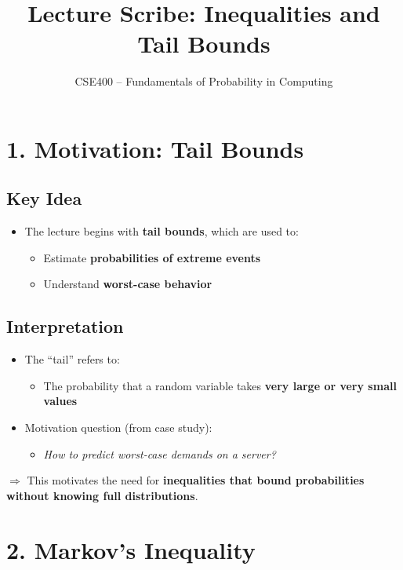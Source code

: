 \documentclass[12pt]{article}
\title{\textbf{Lecture Scribe: Inequalities and Tail Bounds}}
\author{CSE400 – Fundamentals of Probability in Computing}
\date{}
\begin{document}
\maketitle

\section*{1. Motivation: Tail Bounds}

\subsection*{Key Idea}

\begin{itemize}
    \item The lecture begins with \textbf{tail bounds}, which are used to:
    \begin{itemize}
        \item Estimate \textbf{probabilities of extreme events}
        \item Understand \textbf{worst-case behavior}
    \end{itemize}
\end{itemize}

\subsection*{Interpretation}

\begin{itemize}
    \item The ``tail'' refers to:
    \begin{itemize}
        \item The probability that a random variable takes \textbf{very large or very small values}
    \end{itemize}
    \item Motivation question (from case study):
    \begin{itemize}
        \item \textit{How to predict worst-case demands on a server?}
    \end{itemize}
\end{itemize}

\noindent $\Rightarrow$ This motivates the need for \textbf{inequalities that bound probabilities without knowing full distributions}.

\section*{2. Markov’s Inequality}
\end{document}
